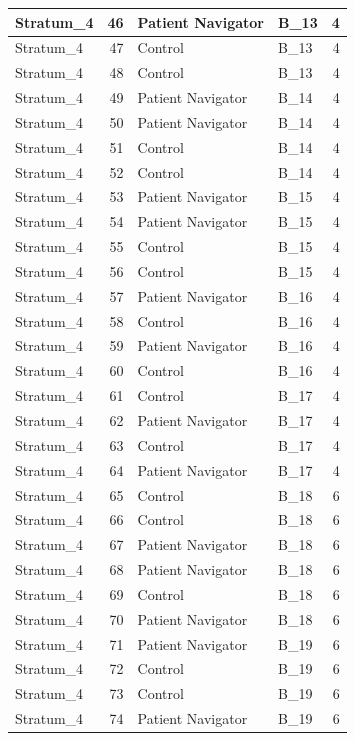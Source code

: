 \documentclass[
]{book}
\begin{document}
\begin{table}[H]
\begin{tabular}{l|r|l|l|r}
\hline
Stratum\_4 & 46 & Patient Navigator & B\_13 & 4\\
\hline
Stratum\_4 & 47 & Control & B\_13 & 4\\
\hline
Stratum\_4 & 48 & Control & B\_13 & 4\\
\hline
Stratum\_4 & 49 & Patient Navigator & B\_14 & 4\\
\hline
Stratum\_4 & 50 & Patient Navigator & B\_14 & 4\\
\hline
Stratum\_4 & 51 & Control & B\_14 & 4\\
\hline
Stratum\_4 & 52 & Control & B\_14 & 4\\
\hline
Stratum\_4 & 53 & Patient Navigator & B\_15 & 4\\
\hline
Stratum\_4 & 54 & Patient Navigator & B\_15 & 4\\
\hline
Stratum\_4 & 55 & Control & B\_15 & 4\\
\hline
Stratum\_4 & 56 & Control & B\_15 & 4\\
\hline
Stratum\_4 & 57 & Patient Navigator & B\_16 & 4\\
\hline
Stratum\_4 & 58 & Control & B\_16 & 4\\
\hline
Stratum\_4 & 59 & Patient Navigator & B\_16 & 4\\
\hline
Stratum\_4 & 60 & Control & B\_16 & 4\\
\hline
Stratum\_4 & 61 & Control & B\_17 & 4\\
\hline
Stratum\_4 & 62 & Patient Navigator & B\_17 & 4\\
\hline
Stratum\_4 & 63 & Control & B\_17 & 4\\
\hline
Stratum\_4 & 64 & Patient Navigator & B\_17 & 4\\
\hline
Stratum\_4 & 65 & Control & B\_18 & 6\\
\hline
Stratum\_4 & 66 & Control & B\_18 & 6\\
\hline
Stratum\_4 & 67 & Patient Navigator & B\_18 & 6\\
\hline
Stratum\_4 & 68 & Patient Navigator & B\_18 & 6\\
\hline
Stratum\_4 & 69 & Control & B\_18 & 6\\
\hline
Stratum\_4 & 70 & Patient Navigator & B\_18 & 6\\
\hline
Stratum\_4 & 71 & Patient Navigator & B\_19 & 6\\
\hline
Stratum\_4 & 72 & Control & B\_19 & 6\\
\hline
Stratum\_4 & 73 & Control & B\_19 & 6\\
\hline
Stratum\_4 & 74 & Patient Navigator & B\_19 & 6\\

\end{tabular}
\end{table}
\end{document}
